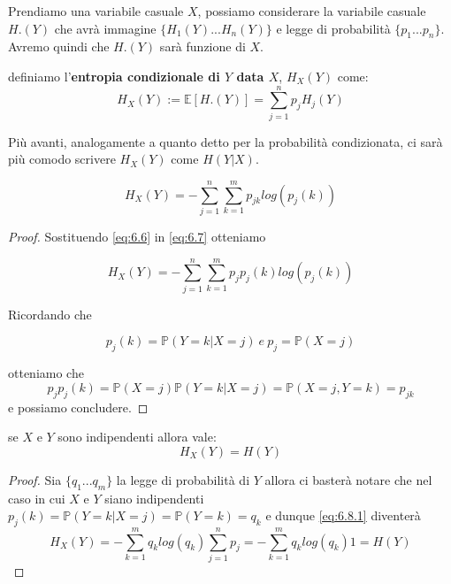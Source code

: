 Prendiamo una variabile casuale $X$, possiamo considerare la variabile casuale $H.(Y)$ che avrà immagine $\{H_1(Y)...H_n(Y) \}$ e legge di probabilità $\{ p _1...p_n\}$. Avremo quindi che $H.(Y)$ sarà funzione di $X$.
\begin{defi}
definiamo l'\textbf{entropia condizionale di $Y$ data $X$}, $H_X(Y)$ come:
\begin{equation}\label{eq:6.7}
H_X(Y):= \mathbb{E}[H.(Y)]= \sum_{j=1}^n p_j H_j(Y)
\end{equation}
\end{defi}
\begin{oss}
Più avanti, analogamente a quanto detto per la probabilità condizionata, ci sarà più comodo scrivere $H_X(Y)$ come $H(Y|X)$.
\end{oss}
\begin{lem} \label{lemma:6.8}
\begin{equation} \label{eq:6.8}
H_X(Y)=-\sum_{j=1}^n\sum_{k=1}^m p_{jk}log(p_j(k))
\end{equation}
\end{lem}
\begin{proof}
Sostituendo \ref{eq:6.6} in \ref{eq:6.7} otteniamo

\begin{equation} \label{eq:6.8.1}
H_X(Y)=-\sum_{j=1}^n\sum_{k=1}^m p_{j}p_j(k)log(p_j(k))
\end{equation}

Ricordando che 

$$p_j(k)=\mathbb{P}(Y=k|X=j)\ e \ p_j=\mathbb{P}(X=j)$$

otteniamo che 
$$p_jp_j(k)=\mathbb{P}(X=j)\mathbb{P}(Y=k|X=j)=\mathbb{P}(X=j,Y=k)=p_{jk}$$
e possiamo concludere.
\end{proof}

\begin{lem}
se $X$ e $Y$ sono indipendenti allora vale:
\begin{equation} \label{lemma:6.4}
H_X(Y)=H(Y)
\end{equation}
\end{lem}
\begin{proof}
Sia $\{q_1...q_m\}$  la legge di probabilità di $Y$ allora ci basterà notare che nel caso in cui $X$ e $Y$ siano indipendenti $p_j(k)=\mathbb{P}(Y=k|X=j)=\mathbb{P}(Y=k)=q_k$
e dunque \ref{eq:6.8.1} diventerà
$$H_X(Y)=-\sum_{k=1}^m q_klog(q_k)\sum_{j=1}^n p_{j}=-\sum_{k=1}^m q_klog(q_k)1=H(Y)$$
\end{proof}

